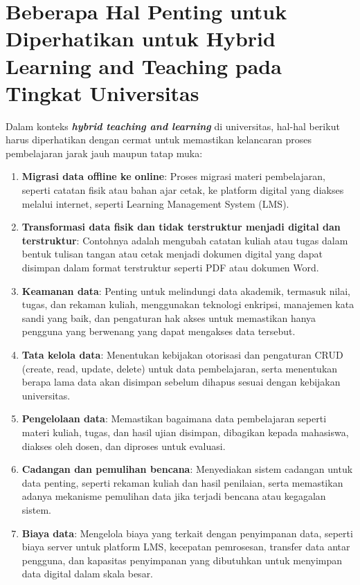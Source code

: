 \section{Beberapa Hal Penting untuk Diperhatikan untuk Hybrid Learning and Teaching pada Tingkat Universitas}
Dalam konteks \textit{\textbf{hybrid teaching and learning}} di universitas, hal-hal berikut harus diperhatikan dengan cermat untuk memastikan kelancaran proses pembelajaran jarak jauh maupun tatap muka:

\begin{enumerate}
	\item \textbf{Migrasi data offline ke online}: Proses migrasi materi pembelajaran, seperti catatan fisik atau bahan ajar cetak, ke platform digital yang diakses melalui internet, seperti Learning Management System (LMS).
	\item \textbf{Transformasi data fisik dan tidak terstruktur menjadi digital dan terstruktur}: Contohnya adalah mengubah catatan kuliah atau tugas dalam bentuk tulisan tangan atau cetak menjadi dokumen digital yang dapat disimpan dalam format terstruktur seperti PDF atau dokumen Word.
	\item \textbf{Keamanan data}: Penting untuk melindungi data akademik, termasuk nilai, tugas, dan rekaman kuliah, menggunakan teknologi enkripsi, manajemen kata sandi yang baik, dan pengaturan hak akses untuk memastikan hanya pengguna yang berwenang yang dapat mengakses data tersebut.
	\item \textbf{Tata kelola data}: Menentukan kebijakan otorisasi dan pengaturan CRUD (create, read, update, delete) untuk data pembelajaran, serta menentukan berapa lama data akan disimpan sebelum dihapus sesuai dengan kebijakan universitas.
	\item \textbf{Pengelolaan data}: Memastikan bagaimana data pembelajaran seperti materi kuliah, tugas, dan hasil ujian disimpan, dibagikan kepada mahasiswa, diakses oleh dosen, dan diproses untuk evaluasi.
	\item \textbf{Cadangan dan pemulihan bencana}: Menyediakan sistem cadangan untuk data penting, seperti rekaman kuliah dan hasil penilaian, serta memastikan adanya mekanisme pemulihan data jika terjadi bencana atau kegagalan sistem.
	\item \textbf{Biaya data}: Mengelola biaya yang terkait dengan penyimpanan data, seperti biaya server untuk platform LMS, kecepatan pemrosesan, transfer data antar pengguna, dan kapasitas penyimpanan yang dibutuhkan untuk menyimpan data digital dalam skala besar.
\end{enumerate}



